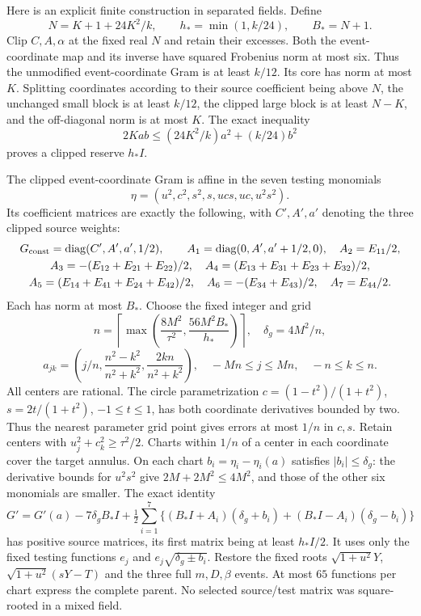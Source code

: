 \documentclass[11pt]{article}
\begin{document}
Here is an explicit finite construction in separated fields. Define
\[
 N=K+1+24K^2/k,\qquad h_* =\min(1,k/24),\qquad B_*=N+1.
\]
Clip $C,A,\alpha$ at the fixed real $N$ and retain their excesses.
Both the event-coordinate map and its inverse have squared Frobenius
norm at most six. Thus the unmodified event-coordinate Gram is at
least $k/12$. Its core has norm at most $K$.
Splitting coordinates according to their source coefficient being
above $N$, the unchanged small block is at least $k/12$, the clipped
large block is at least $N-K$, and the off-diagonal norm is at most $K$.
The exact inequality
\[
 2Kab\le(24K^2/k)a^2+(k/24)b^2
\]
proves a clipped reserve $h_*I$.

The clipped event-coordinate Gram is affine in the seven testing
monomials
\[
 \eta=(u^2,c^2,s^2,s,ucs,uc,u^2s^2).
\]
Its coefficient matrices are exactly the following, with
$C',A',a'$ denoting the three clipped source weights:
\begin{gather*}
 G_{\rm const}=\operatorname{diag}(C',A',a',1/2),\qquad
 A_1=\operatorname{diag}(0,A',a'+1/2,0),\quad A_2=E_{11}/2,\\
 A_3=-(E_{12}+E_{21}+E_{22})/2,\quad
 A_4=(E_{13}+E_{31}+E_{23}+E_{32})/2,\\
 A_5=(E_{14}+E_{41}+E_{24}+E_{42})/2,\quad
 A_6=-(E_{34}+E_{43})/2,\quad A_7=E_{44}/2.
\end{gather*}
Each has norm at most $B_*$.
Choose the fixed integer and grid
\[
 n=\left\lceil\max\left(\frac{8M^2}{\tau^2},
                         \frac{56M^2B_*}{h_*}\right)\right\rceil,
 \quad \delta_g=4M^2/n,
\]
\[
 a_{jk}=\left(j/n,\frac{n^2-k^2}{n^2+k^2},
                         \frac{2kn}{n^2+k^2}\right),
 \quad -Mn\le j\le Mn,\quad -n\le k\le n.
\]
All centers are rational. The circle parametrization
$c=(1-t^2)/(1+t^2)$, $s=2t/(1+t^2)$, $-1\le t\le1$,
has both coordinate derivatives bounded by two. Thus the nearest
parameter grid point gives errors at most $1/n$ in $c,s$.
Retain centers with $u_j^2+c_k^2\ge\tau^2/2$.
Charts within $1/n$ of a center in each coordinate cover the target
annulus. On each chart $b_i=\eta_i-\eta_i(a)$ satisfies
$|b_i|\le\delta_g$: the derivative bounds for $u^2s^2$ give
$2M+2M^2\le4M^2$, and those of the other six monomials are smaller.
The exact identity
\[
 G'=G'(a)-7\delta_gB_*I
 +\tfrac12\sum_{i=1}^7
 \{(B_*I+A_i)(\delta_g+b_i)+(B_*I-A_i)(\delta_g-b_i)\}
\]
has positive source matrices, its first matrix being at least
$h_*I/2$. It uses only the fixed testing functions
$e_j$ and $e_j\sqrt{\delta_g\pm b_i}$.
Restore the fixed roots $\sqrt{1+u^2}Y$,
$\sqrt{1+u^2}(sY-T)$ and the three full $m,D,\beta$ events.
At most $65$ functions per chart express the complete parent.
No selected source/test matrix was square-rooted in a mixed field.
\end{document}
